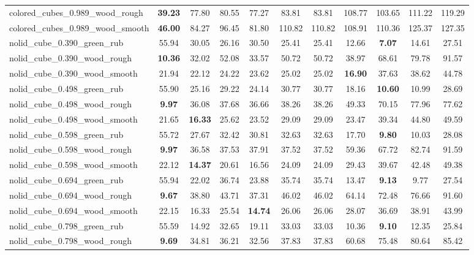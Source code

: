 \begin{table}[H]
{\begin{tabular}{l cccccccccc}
        colored\_cubes\_0.989\_wood\_rough & \textbf{39.23} & 77.80 & 80.55 & 77.27 & 83.81 & 83.81 & 108.77 & 103.65 & 111.22 & 119.29 \\
        colored\_cubes\_0.989\_wood\_smooth & \textbf{46.00} & 84.27 & 96.45 & 81.80 & 110.82 & 110.82 & 108.91 & 110.36 & 125.37 & 127.35 \\
        nolid\_cube\_0.390\_green\_rub & 55.94 & 30.05 & 26.16 & 30.50 & 25.41 & 25.41 & 12.66 & \textbf{7.07} & 14.61 & 27.51 \\
        nolid\_cube\_0.390\_wood\_rough & \textbf{10.36} & 32.02 & 52.08 & 33.57 & 50.72 & 50.72 & 38.97 & 68.61 & 79.78 & 91.57 \\
        nolid\_cube\_0.390\_wood\_smooth & 21.94 & 22.12 & 24.22 & 23.62 & 25.02 & 25.02 & \textbf{16.90} & 37.63 & 38.62 & 44.78 \\
        nolid\_cube\_0.498\_green\_rub & 55.90 & 25.16 & 29.22 & 24.14 & 30.77 & 30.77 & 18.16 & \textbf{10.60} & 10.99 & 28.69 \\
        nolid\_cube\_0.498\_wood\_rough & \textbf{9.97} & 36.08 & 37.68 & 36.66 & 38.26 & 38.26 & 49.33 & 70.15 & 77.96 & 77.62 \\
        nolid\_cube\_0.498\_wood\_smooth & 21.65 & \textbf{16.33} & 25.62 & 23.52 & 29.09 & 29.09 & 23.47 & 39.34 & 44.80 & 49.59 \\
        nolid\_cube\_0.598\_green\_rub & 55.72 & 27.67 & 32.42 & 30.81 & 32.63 & 32.63 & 17.70 & \textbf{9.80} & 10.03 & 28.08 \\
        nolid\_cube\_0.598\_wood\_rough & \textbf{9.97} & 36.58 & 37.53 & 37.91 & 37.52 & 37.52 & 59.36 & 67.72 & 82.74 & 91.59 \\
        nolid\_cube\_0.598\_wood\_smooth & 22.12 & \textbf{14.37} & 20.61 & 16.56 & 24.09 & 24.09 & 29.43 & 39.67 & 42.48 & 49.38 \\
        nolid\_cube\_0.694\_green\_rub & 55.94 & 22.02 & 36.74 & 23.88 & 35.74 & 35.74 & 13.47 & \textbf{9.13} & 9.77 & 27.54 \\
        nolid\_cube\_0.694\_wood\_rough & \textbf{9.67} & 38.80 & 43.71 & 37.31 & 46.02 & 46.02 & 64.14 & 72.48 & 76.66 & 91.60 \\
        nolid\_cube\_0.694\_wood\_smooth & 22.15 & 16.33 & 25.54 & \textbf{14.74} & 26.06 & 26.06 & 28.07 & 36.69 & 38.91 & 43.99 \\
        nolid\_cube\_0.798\_green\_rub & 55.59 & 14.92 & 32.65 & 19.11 & 33.03 & 33.03 & 10.36 & \textbf{9.10} & 12.35 & 25.84 \\
        nolid\_cube\_0.798\_wood\_rough & \textbf{9.69} & 34.81 & 36.21 & 32.56 & 37.83 & 37.83 & 60.68 & 75.48 & 80.64 & 85.42 \\

\end{tabular}}
\end{table}
